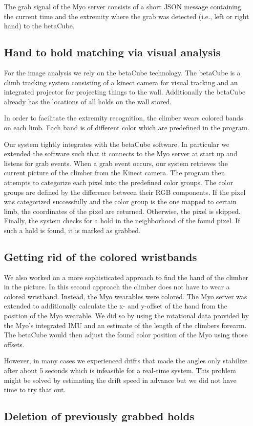 The grab signal of the Myo server consists of a short JSON message containing the current time and the extremity where the grab was detected (i.e., left or right hand) to the betaCube.

\subsection{Hand to hold matching via visual analysis}
For the image analysis we rely on the betaCube technology.
The betaCube is a climb tracking system consisting of a kinect camera for visual tracking and an integrated projector for projecting things to the wall.
Additionally the betaCube already has the locations of all holds on the wall stored.

In order to facilitate the extremity recognition, the climber wears colored bands on each limb.
Each band is of different color which are predefined in the program.

Our system tightly integrates with the betaCube software.
In particular we extended the software such that it connects to the Myo server at start up and listens for grab events.
When a grab event occurs, our system retrieves the current picture of the climber from the Kinect camera.
The program then attempts to categorize each pixel into the predefined color groups.
The color groups are defined by the difference between their RGB components.
If the pixel was categorized successfully and the color group is the one mapped to certain limb, the coordinates of the pixel are returned.
Otherwise, the pixel is skipped.
Finally, the system checks for a hold in the neighborhood of the found pixel.
If such a hold is found, it is marked as grabbed.

\subsection{Getting rid of the colored wristbands}
We also worked on a more sophisticated approach to find the hand of the climber in the picture.
In this second approach the climber does not have to wear a colored wristband.
Instead, the Myo wearables were colored.
The Myo server was extended to additionally calculate the x- and y-offset of the hand from the position of the Myo wearable.
We did so by using the rotational data provided by the Myo's integrated IMU and an estimate of the length of the climbers forearm.
The betaCube would then adjust the found color position of the Myo using those offsets.

However, in many cases we experienced drifts that made the angles only stabilize after about 5 seconds which is infeasible for a real-time system.
This problem might be solved by estimating the drift speed in advance but we did not have time to try that out.

\subsection{Deletion of previously grabbed holds}

